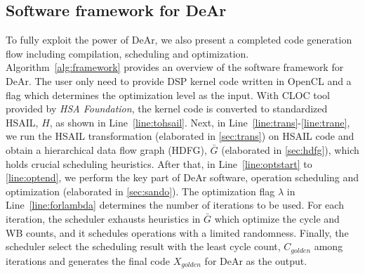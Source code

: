         \subsection{Software framework for DeAr}
            To fully exploit the power of DeAr, we also present a completed code generation flow including compilation, scheduling and optimization.
            Algorithm~\ref{alg:framework} provides an overview of the software framework for DeAr. 
            The user only need to provide DSP kernel code written in OpenCL and a flag which determines the optimization level as the input.
            With CLOC \cite{cloc} tool provided by \textit{HSA Foundation}, the kernel code is converted to standardized HSAIL, $H$, as shown in Line~\ref{line:tohsail}.
            Next, in Line~\ref{line:trans}-\ref{line:trane}, 
            we run the HSAIL transformation (elaborated in \ref{sec:trans}) on HSAIL code and obtain a hierarchical data flow graph (HDFG), 
            $\bar{G}$ (elaborated in \ref{sec:hdfg}), which holds crucial scheduling heuristics.
            After that, in Line~\ref{line:optstart} to \ref{line:optend}, we perform the key part of DeAr software, 
            operation scheduling and optimization (elaborated in \ref{sec:sando}).
            The optimization flag $\lambda$ in Line~\ref{line:forlambda} determines the number of iterations to be used.
            For each iteration, the scheduler exhausts heuristics in $\bar{G}$ which optimize the cycle and WB counts, 
            and it schedules operations with a limited randomness.
            Finally, the scheduler select the scheduling result with the least cycle count, 
            $C_{golden}$ among iterations and generates the final code $X_{golden}$ for DeAr as the output.
